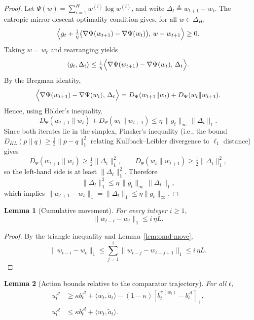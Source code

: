\documentclass[11pt]{article}
\newtheorem{lemma}{Lemma}
\begin{document}
\begin{proof}
Let \(\Psi(w)=\sum_{i=1}^H w^{(i)}\log w^{(i)}\), and write \(\Delta_t\triangleq w_{t+1}-w_t\). The entropic mirror-descent optimality condition gives, for all \(w\in\Delta_H\),
\[
\Bigl\langle g_t + \tfrac{1}{\eta}\bigl(\nabla\Psi(w_{t+1})-\nabla\Psi(w_t)\bigr),\, w-w_{t+1}\Bigr\rangle \ge 0.
\]
Taking \(w=w_t\) and rearranging yields
\[
\langle g_t,\Delta_t\rangle
\le
\tfrac{1}{\eta}\Bigl\langle \nabla\Psi(w_{t+1})-\nabla\Psi(w_t),\,\Delta_t\Bigr\rangle.
\]
By the Bregman identity,
\[
\Bigl\langle \nabla\Psi(w_{t+1})-\nabla\Psi(w_t),\,\Delta_t\Bigr\rangle
=
D_\Psi(w_{t+1}\|w_t)+D_\Psi(w_t\|w_{t+1}).
\]
Hence, using Hölder's inequality,
\[
D_\Psi(w_{t+1}\|w_t)+D_\Psi(w_t\|w_{t+1})
\le
\eta\,\|g_t\|_\infty\,\|\Delta_t\|_1.
\]
Since both iterates lie in the simplex, Pinsker's inequality (i.e., the bound $D_{KL}(p\|q)\ge \tfrac12\|p-q\|_1^2$ relating Kullback--Leibler divergence to $\ell_1$ distance) gives
\[
D_\Psi(w_{t+1}\|w_t)\ge \tfrac12\|\Delta_t\|_1^2,
\qquad
D_\Psi(w_t\|w_{t+1})\ge \tfrac12\|\Delta_t\|_1^2,
\]
so the left-hand side is at least \(\|\Delta_t\|_1^2\). Therefore
\[
\|\Delta_t\|_1^2
\le
\eta\,\|g_t\|_\infty\,\|\Delta_t\|_1,
\]
which implies \(\|w_{t+1}-w_t\|_1=\|\Delta_t\|_1\le \eta\|g_t\|_\infty\).
\end{proof}

\begin{lemma}[Cumulative movement]
\label{cor:cum-move}
For every integer \(i\ge 1\),
\[
\|w_{t-i}-w_t\|_1 \le i\,\eta L.
\]
\end{lemma}

\begin{proof}
By the triangle inequality and Lemma~\ref{lem:omd-move},
\[
\|w_{t-i}-w_t\|_1
\le
\sum_{j=1}^i \|w_{t-j}-w_{t-j+1}\|_1
\le i\,\eta L.
\]
\end{proof}

\begin{lemma}[Action bounds relative to the comparator trajectory]
\label{lem:bounding-u-eff}
For all \(t\),
\begin{align}
u_t^{\mathcal A}
&\ge
\kappa b_t^{\mathcal A}+\langle w_t,\widetilde a_t\rangle
- (1-\kappa)[b_t^{\pi(w_t)}-b_t^{\mathcal A}]_+,\label{eq:u-lower-bound-eff}\\[4pt]
u_t^{\mathcal A}
&\le
\kappa b_t^{\mathcal A}+\langle w_t,\widetilde a_t\rangle.\label{eq:u-upper-bound-eff}
\end{align}
\end{lemma}
\end{document}
